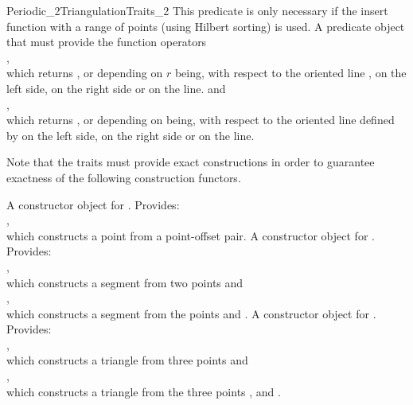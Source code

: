 \begin{ccRefConcept}{Periodic_2TriangulationTraits_2}
{%
This predicate is only necessary if the insert function with a range of
points (using Hilbert sorting) is used.
}
%
{A predicate object that must provide the function operators\\
  ,\\
  which returns ,  or 
  depending on $r$ being, with respect to the oriented line ,
  on the left side, on the right side or on the line.
  and \\
  ,\\
  which returns ,  or 
  depending on  being, with respect to the oriented line
  defined by  on the left side, on the right side
  or on the line.}

Note that the traits must provide exact constructions in order to
guarantee exactness of the following construction functors.

 {A constructor object for
. Provides: \\
, \\ 
which constructs a point from a point-offset pair.
%
}
%
 {A constructor object for
. Provides: \\
, \\ 
which constructs a  segment from two points and\\
, \\ 
which constructs a  segment from the points  and  .
}
%
 {A constructor object for
  . Provides: \\
  , \\
  which constructs a triangle from three points and\\
  , \\
  which constructs a triangle from the three points ,
   and .  }


\end{ccRefConcept}

